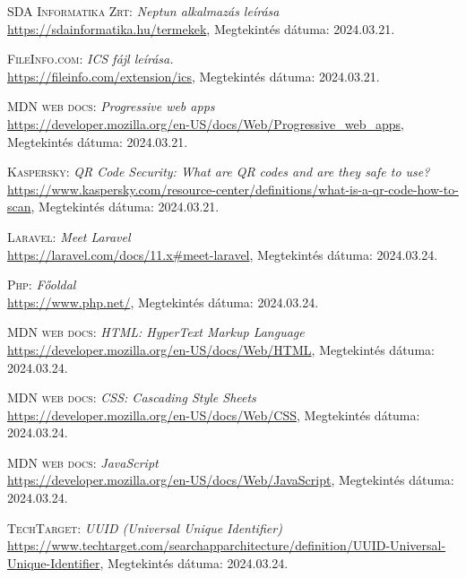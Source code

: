 \documentclass[
]{thesis-ekf}
\theoremstyle{definition}
\theoremstyle{remark}
\begin{document}
\begin{thebibliography}{47}

\textsc{SDA Informatika Zrt:} \emph{Neptun alkalmazás leírása}
\\
\url{https://sdainformatika.hu/termekek}, Megtekintés dátuma: 2024.03.21.

\textsc{FileInfo.com}: \emph{ICS fájl leírása.}
\\
\url{https://fileinfo.com/extension/ics}, Megtekintés dátuma: 2024.03.21.

\textsc{MDN web docs}: \emph{Progressive web apps}
\\
\url{https://developer.mozilla.org/en-US/docs/Web/Progressive_web_apps}, Megtekintés dátuma: 2024.03.21.

\textsc{Kaspersky}: \emph{QR Code Security: What are QR codes and are they safe to use?}
\\
\url{https://www.kaspersky.com/resource-center/definitions/what-is-a-qr-code-how-to-scan}, Megtekintés dátuma: 2024.03.21.

\textsc{Laravel}: \emph{Meet Laravel}
\\
\url{https://laravel.com/docs/11.x#meet-laravel}, Megtekintés dátuma: 2024.03.24.

\textsc{Php}: \emph{Főoldal}
\\
\url{https://www.php.net/}, Megtekintés dátuma: 2024.03.24.

\textsc{MDN web docs}: \emph{HTML: HyperText Markup Language}
\\
\url{https://developer.mozilla.org/en-US/docs/Web/HTML}, Megtekintés dátuma: 2024.03.24.

\textsc{MDN web docs}: \emph{CSS: Cascading Style Sheets}
\\
\url{https://developer.mozilla.org/en-US/docs/Web/CSS}, Megtekintés dátuma: 2024.03.24.

\textsc{MDN web docs}: \emph{JavaScript}
\\
\url{https://developer.mozilla.org/en-US/docs/Web/JavaScript}, Megtekintés dátuma: 2024.03.24.

\textsc{TechTarget}: \emph{UUID (Universal Unique Identifier)}
\\
\url{https://www.techtarget.com/searchapparchitecture/definition/UUID-Universal-Unique-Identifier}, Megtekintés dátuma: 2024.03.24.


\end{thebibliography}
\end{document}
